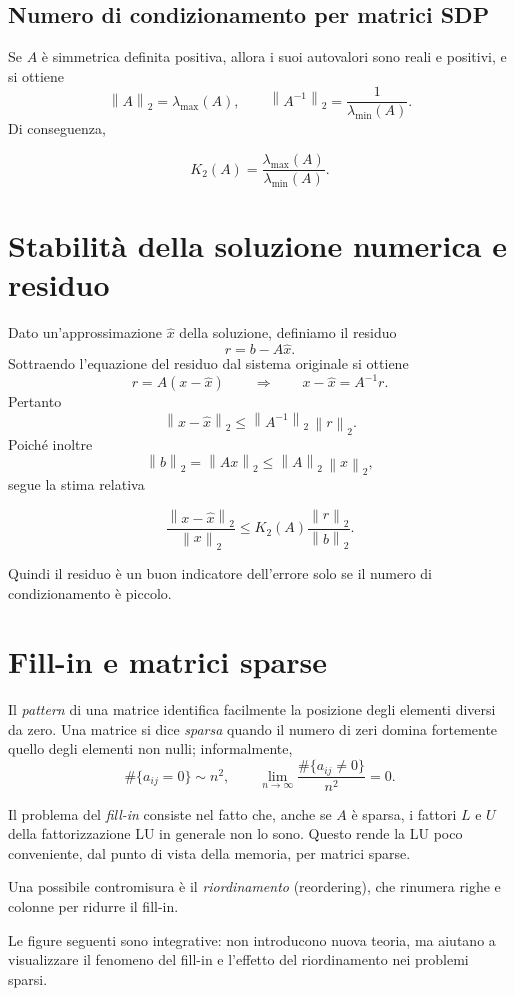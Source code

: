 \documentclass[11pt,a4paper]{report}
\newcommand{\norm}[1]{\left\lVert #1 \right\rVert}
\begin{document}
\subsection{Numero di condizionamento per matrici SDP}
Se $A$ \`e simmetrica definita positiva, allora i suoi autovalori sono reali e positivi, e si ottiene
\[
\norm{A}_2=\lambda_{\max}(A),
\qquad
\norm{A^{-1}}_2=\frac1{\lambda_{\min}(A)}.
\]
Di conseguenza,
\begin{formulaBox}
\[
K_2(A)=\frac{\lambda_{\max}(A)}{\lambda_{\min}(A)}.
\]
\end{formulaBox}

\section{Stabilit\`a della soluzione numerica e residuo}
Dato un'approssimazione $\hat x$ della soluzione, definiamo il residuo
\[
r=b-A\hat x.
\]
Sottraendo l'equazione del residuo dal sistema originale si ottiene
\[
r=A(x-\hat x)
\qquad \Longrightarrow \qquad
x-\hat x=A^{-1}r.
\]
Pertanto
\[
\norm{x-\hat x}_2\le \norm{A^{-1}}_2\,\norm r_2.
\]
Poich\'e inoltre
\[
\norm b_2=\norm{Ax}_2\le \norm A_2\,\norm x_2,
\]
segue la stima relativa
\begin{formulaBox}
\[
\frac{\norm{x-\hat x}_2}{\norm{x}_2}
\le K_2(A)\frac{\norm r_2}{\norm b_2}.
\]
\end{formulaBox}
Quindi il residuo \`e un buon indicatore dell'errore solo se il numero di condizionamento \`e piccolo.

\section{Fill-in e matrici sparse}
Il \emph{pattern} di una matrice identifica facilmente la posizione degli elementi diversi da zero.
Una matrice si dice \emph{sparsa} quando il numero di zeri domina fortemente quello degli elementi non nulli; informalmente,
\[
\#\{a_{ij}=0\}\sim n^2,
\qquad
\lim_{n\to\infty}\frac{\#\{a_{ij}\neq 0\}}{n^2}=0.
\]

Il problema del \emph{fill-in} consiste nel fatto che, anche se $A$ \`e sparsa,
i fattori $L$ e $U$ della fattorizzazione LU in generale non lo sono.
Questo rende la LU poco conveniente, dal punto di vista della memoria, per matrici sparse.

Una possibile contromisura \`e il \emph{riordinamento} (reordering), che rinumera righe e colonne per ridurre il fill-in.

Le figure seguenti sono integrative: non introducono nuova teoria, ma aiutano a visualizzare il fenomeno del fill-in e l'effetto del riordinamento nei problemi sparsi.
\end{document}
